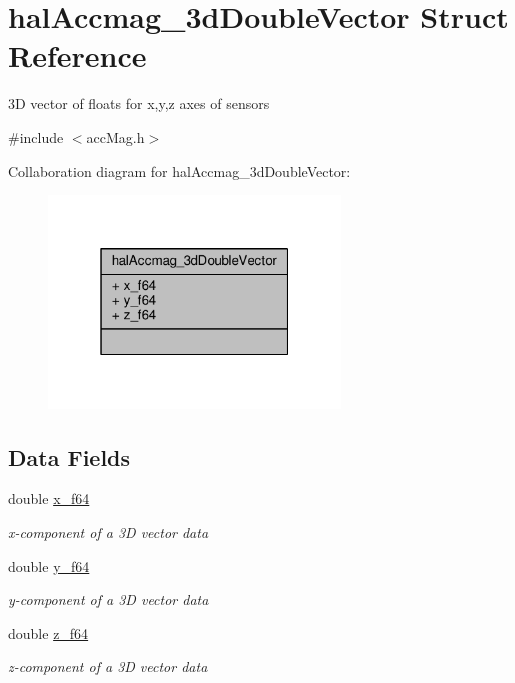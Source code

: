 \hypertarget{structhalAccmag__3dDoubleVector}{\section{hal\+Accmag\+\_\+3d\+Double\+Vector Struct Reference}
\label{structhalAccmag__3dDoubleVector}
}


3\+D vector of floats for x,y,z axes of sensors  




{\ttfamily \#include $<$acc\+Mag.\+h$>$}



Collaboration diagram for hal\+Accmag\+\_\+3d\+Double\+Vector\+:
\nopagebreak
\begin{figure}[H]
\begin{center}
\leavevmode
\includegraphics[width=220pt]{structhalAccmag__3dDoubleVector__coll__graph}
\end{center}
\end{figure}
\subsection*{Data Fields}
\begin{DoxyCompactItemize}
\item 
double \hyperlink{structhalAccmag__3dDoubleVector_a011646ea6f4b78400dfd2ffa8eb45eea_a011646ea6f4b78400dfd2ffa8eb45eea}{x\+\_\+f64}
\begin{DoxyCompactList}\small\item\em x-\/component of a 3\+D vector data \end{DoxyCompactList}\item 
double \hyperlink{structhalAccmag__3dDoubleVector_a88f4ed3363ccaa08c00d2fc28f7b2ab4_a88f4ed3363ccaa08c00d2fc28f7b2ab4}{y\+\_\+f64}
\begin{DoxyCompactList}\small\item\em y-\/component of a 3\+D vector data \end{DoxyCompactList}\item 
double \hyperlink{structhalAccmag__3dDoubleVector_a5041b0551694f5f4057a5f3454782e44_a5041b0551694f5f4057a5f3454782e44}{z\+\_\+f64}
\begin{DoxyCompactList}\small\item\em z-\/component of a 3\+D vector data \end{DoxyCompactList}\end{DoxyCompactItemize}


